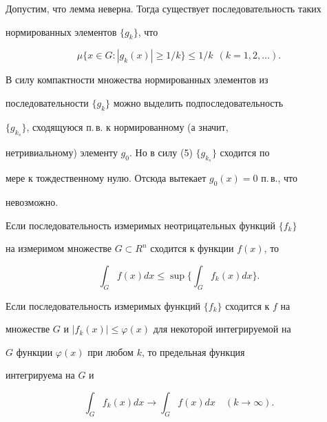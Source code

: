  


 


\begin{pf} 


Допустим, что лемма неверна. Тогда существует последовательность таких 


нормированных элементов $\{g_k\}$, что 


\begin{equation} 


\mu\{x\in G:|g_k(x)|\ge1/k\}\le 1/k \ \ (k=1,2,\dotsc). 


\end{equation} 


 


В силу компактности множества нормированных элементов из 


последовательности $\{g_k\}$ можно выделить подпоследовательность 


$\{g_{k_s}\}$, сходящуюся п.\,в. к нормированному (а значит, 


нетривиальному) элементу $g_0$. Но в силу (5) $\{g_{k_s}\}$ сходится по 


мере к тождественному нулю. Отсюда вытекает $g_0(x)=0$ п.\,в., что 


невозможно. 


\end{pf} 


 


 


\begin{lem} 


Если  последовательность измеримых неотрицательных функций $\{f_k\}$


на измеримом множестве $G\subset R^n$ сходится к функции $f(x)$, то 


$$ 


\int_G f(x)dx\le\sup\bigg\{\int_G f_k(x)dx\bigg\}. 


$$ 


\end{lem} 


 


 


\begin{lem} 


Если последовательность измеримых функций $\{f_k\}$ сходится к $f$ на 


множестве $G$ и $|f_k(x)|\le\varphi(x)$ для некоторой интегрируемой на 


$G$ функции $\varphi(x)$ при любом $k$, то предельная функция 


интегрируема на $G$ и 


$$ 


\int_G f_k(x)dx\to\int_G f(x)dx\quad (k\to\infty). 


$$ 


\end{lem} 


